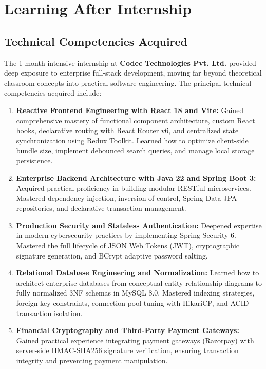 \chapter{Learning After Internship}
\label{ch:learnings}

\section{Technical Competencies Acquired}
The 1-month intensive internship at \textbf{Codec Technologies Pvt. Ltd.} provided deep exposure to enterprise full-stack development, moving far beyond theoretical classroom concepts into practical software engineering. The principal technical competencies acquired include:
\begin{enumerate}[leftmargin=2.0em]
    \item \textbf{Reactive Frontend Engineering with React 18 and Vite:} Gained comprehensive mastery of functional component architecture, custom React hooks, declarative routing with React Router v6, and centralized state synchronization using Redux Toolkit. Learned how to optimize client-side bundle size, implement debounced search queries, and manage local storage persistence.
    \item \textbf{Enterprise Backend Architecture with Java 22 and Spring Boot 3:} Acquired practical proficiency in building modular RESTful microservices. Mastered dependency injection, inversion of control, Spring Data JPA repositories, and declarative transaction management.
    \item \textbf{Production Security and Stateless Authentication:} Deepened expertise in modern cybersecurity practices by implementing Spring Security 6. Mastered the full lifecycle of JSON Web Tokens (JWT), cryptographic signature generation, and BCrypt adaptive password salting.
    \item \textbf{Relational Database Engineering and Normalization:} Learned how to architect enterprise databases from conceptual entity-relationship diagrams to fully normalized 3NF schemas in MySQL 8.0. Mastered indexing strategies, foreign key constraints, connection pool tuning with HikariCP, and ACID transaction isolation.
    \item \textbf{Financial Cryptography and Third-Party Payment Gateways:} Gained practical experience integrating payment gateways (Razorpay) with server-side HMAC-SHA256 signature verification, ensuring transaction integrity and preventing payment manipulation.
\end{enumerate}

